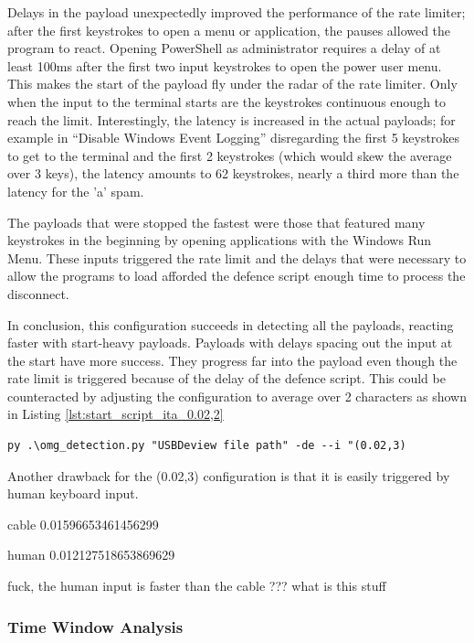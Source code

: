 Delays in the payload unexpectedly improved the performance of the rate limiter; after the first keystrokes to open a menu or application, the pauses allowed the program to react. Opening PowerShell as administrator requires a delay of at least 100ms after the first two input keystrokes to open the power user menu. This makes the start of the payload fly under the radar of the rate limiter. Only when the input to the terminal starts are the keystrokes continuous enough to reach the limit. Interestingly, the latency is increased in the actual payloads; for example in ``Disable Windows Event Logging'' disregarding the first 5 keystrokes to get to the terminal and the first 2 keystrokes (which would skew the average over 3 keys), the latency amounts to 62 keystrokes, nearly a third more than the latency for the 'a' spam.

The payloads that were stopped the fastest were those that featured many keystrokes in the beginning by opening applications with the Windows Run Menu. These inputs triggered the rate limit and the delays that were necessary to allow the programs to load afforded the defence script enough time to process the disconnect.  

In conclusion, this configuration succeeds in detecting all the payloads, reacting faster with start-heavy payloads. Payloads with delays spacing out the input at the start have more success. They progress far into the payload even though the rate limit is triggered because of the delay of the defence script. This could be counteracted by adjusting the configuration to average over 2 characters as shown in Listing \ref{lst:start_script_ita_0.02,2}   

\begin{lstlisting}[caption={start Defense Script with ITA (0.02,2)},label={lst:start_script_ita_0.02,2}, captionpos=b]
 py .\omg_detection.py "USBDeview file path" -de --i "(0.02,3)
\end{lstlisting}

Another drawback for the (0.02,3) configuration is that it is easily triggered by human keyboard input. 

cable
0.01596653461456299


human
0.012127518653869629


fuck, the human input is faster than the cable ??? what is this stuff





\subsubsection{Time Window Analysis}

